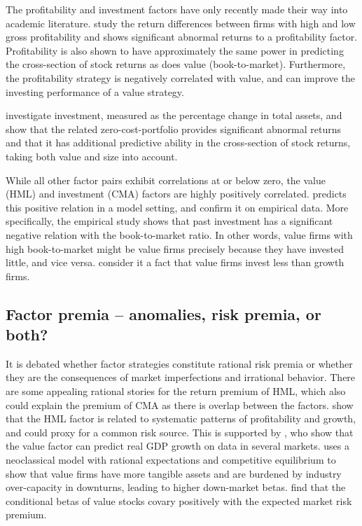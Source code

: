 The profitability and investment factors have only recently made their way into academic literature. \textcite{NovyMarx2013} study the return differences between firms with high and low gross profitability and shows significant abnormal returns to a profitability factor. Profitability is also shown to have approximately the same power in predicting the cross-section of stock returns as does value (book-to-market). Furthermore, the profitability strategy is negatively correlated with value, and can improve the investing performance of a value strategy. 

\textcite{CooperGulenSchill2008} investigate investment, measured as the percentage change in total assets, and show that the related zero-cost-portfolio provides significant abnormal returns and that it has additional predictive ability in the cross-section of stock returns, taking both value and size into account.

While all other factor pairs exhibit correlations at or below zero, the value (HML) and investment (CMA) factors are highly positively correlated. \textcite{Zhang2005} predicts this positive relation in a model setting, and \textcite{AndersonGarciaFeijoo2006} confirm it on empirical data. More specifically, the empirical study shows that past investment has a significant negative relation with the book-to-market ratio. In other words, value firms with high book-to-market might be value firms precisely because they have invested little, and vice versa. \textcite{FF2015} consider it a fact that value firms invest less than growth firms.

\subsection{Factor premia -- anomalies, risk premia, or both?}
It is debated whether factor strategies constitute rational risk premia or whether they are the consequences of market imperfections and irrational behavior. There are some appealing rational stories for the return premium of HML, which also could explain the premium of CMA as there is overlap between the factors. \textcite{FamaFrench1993} show that the HML factor is related to systematic patterns of profitability and growth, and could proxy for a common risk source. This is supported by \textcite{LiewVassalou2000}, who show that the value factor can predict real GDP growth on data in several markets. \textcite{Zhang2005} uses a neoclassical model with rational expectations and competitive equilibrium to show that value firms have more tangible assets and are burdened by industry over-capacity in downturns, leading to higher down-market betas. \textcite{PetkovaZhang2005} find that the conditional betas of value stocks covary positively with the expected market risk premium.


